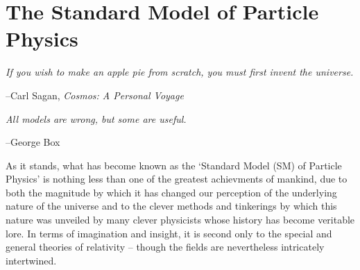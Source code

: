 \chapter{The Standard Model of Particle Physics}

	

\epigraph{\textit{If you wish to make an apple pie from scratch, you must first invent the universe.}}{--Carl Sagan, \textit{Cosmos: A Personal Voyage}}
\epigraph{\textit{All models are wrong, but some are useful.}}{--George Box}


As it stands, what has become known as the `Standard Model (SM) of Particle Physics'
is nothing less than one of the greatest achievments of mankind, due to both
the magnitude by which it has changed our perception of the underlying
nature of the universe and to the clever methods and tinkerings by which this
nature was unveiled by many clever physicists whose history has become veritable lore.
In terms of imagination and insight, it is second only to the special and general theories of relativity --
though the fields are nevertheless intricately intertwined.

